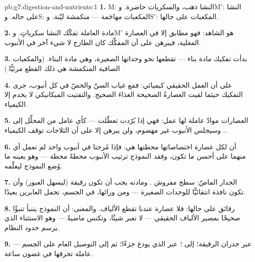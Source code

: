 \begin{solution}{pb:g7:digestion-and-nutrients:1}
\textbf{1.} M: النشا ذهب، والسكريات حاضرة. وM$'$: النشا على حاله.
وS: المكعبات مهاجَمة --- منكمشة ليّنة. وS$'$: المكعبات على حالها.

\textbf{2.} مادة  العاملة تفكّك النشا سكرياتٍ. وM$'$ هو
الشاهد: فهو مطابق إلا في العصارة المغلية، فيبرهن على أن المفكِّك
كان  الطازج لا شيء آخر في الأنبوب.

\textbf{3.} بدأت تفكيك مادة بناء  --- تقطعها نحو وحداتها
الصغيرة، وهي  مادة البناء. (والمكعبات الصافية المنكمشة هي
ذلك القطع مرئيًّا.)

\textbf{4.} على أن العمل الحقيقي كيميائي: فمع غياب السنّ والخضّ في
كل أنبوب، جرى التفكيك حيثما لقيت العصارةُ الصحيحة الغذاءَ الصحيح.
والتفتيت الميكانيكي لا يخدم إلا الكيمياء.

\textbf{5.} العصارات موادّ عاملة لها  عمل: فهي إذا بُرّدت
تعطّلت --- كأي عامل من المحلِّل إلى . وسيجلس الأنبوب غير
مهضوم، ولن يبرهن إلا على أن الثلاجات توقف الكيمياء.

\textbf{6.} أن لكل عصارة اختصاصاتها  محطتها هي: فإذا مُزجتا في
أنبوب واحد لم تعمل أي منهما على أحسن ما تكون، وفقد النموذج ترتيب
الأنبوب محطةً محطة --- وهو بعينه ما وُضع النموذج ليعلّمه.

\textbf{7.} الجدار الماصّ: سطح مفروش . ومادته يجب أن تكون
رقيقة (ليسهل العبور) وأن تكون نافذة انتقائيًّا للوحدات الصغيرة ---
ومن ورائها، في الجسم،  تحمل العابرين بعيدًا.

\textbf{8.} رقائق على حالها: فلا عصارة عندنا تقطع الألياف.
والمعنى: أن النموذج يتنبأ تنبؤًا صحيحًا بمصير الألياف الحقيقي ---
لا تعبر شيئًا، وتكنس ماضيةً --- وهو الاستثناء الذي يرسم حدود
النظام.

\textbf{9.} عبر جدران  الرقيقة؛ إلى ؛ عبر  الذي
يودع جزءًا؛ ثم إلى التوصيل العام على  الجسم ---  عاملة
تحرقها في غضون ساعة.


\end{solution}

